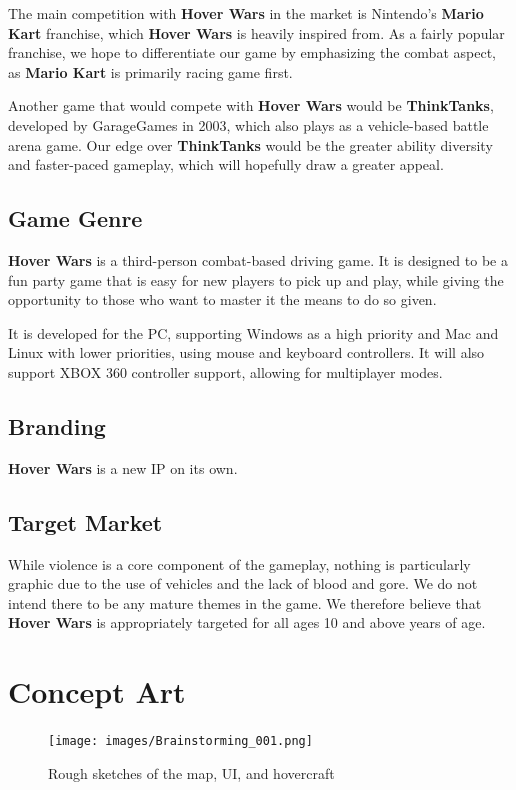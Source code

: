 \documentclass{article}
\newcommand{\namenobold}{Hover Wars}
\newcommand{\name}{\textbf{\namenobold}}
\theoremstyle{definition}
\begin{document}
The main competition with \name{} in the market is Nintendo's \textbf{Mario Kart}
franchise, which \name{} is heavily inspired from. As a fairly popular
franchise, we hope to differentiate our game by emphasizing the combat aspect,
as \textbf{Mario Kart} is primarily racing game first.

Another game that would compete with \name{} would be \textbf{ThinkTanks},
developed by GarageGames in 2003, which also plays as a vehicle-based battle
arena game. Our edge over \textbf{ThinkTanks} would be the greater ability
diversity and faster-paced gameplay, which will hopefully draw a greater
appeal.

\subsection{Game Genre} %

\name{} is a third-person combat-based driving game. It is designed to be
a fun party game that is easy for new players to pick up and play, while giving
the opportunity to those who want to master it the means to do so given.

It is developed for the PC, supporting Windows as a high priority and Mac and
Linux with lower priorities, using mouse and keyboard controllers. It will also
support XBOX 360 controller support, allowing for multiplayer modes.

\subsection{Branding}

\name{} is a new IP on its own.

\subsection{Target Market}

While violence is a core component of the gameplay, nothing is particularly
graphic due to the use of vehicles and the lack of blood and gore. We do not
intend there to be any mature themes in the game. We therefore believe that
\name{} is appropriately targeted for all ages 10 and above years of age.

\section{Concept Art}

\begin{figure}[htpb]
  \centering
  \texttt{[image: images/Brainstorming\_001.png]}
  \caption{Rough sketches of the map, UI, and hovercraft}
\label{fig:Brainstorming_001}
\end{figure}
\end{document}
